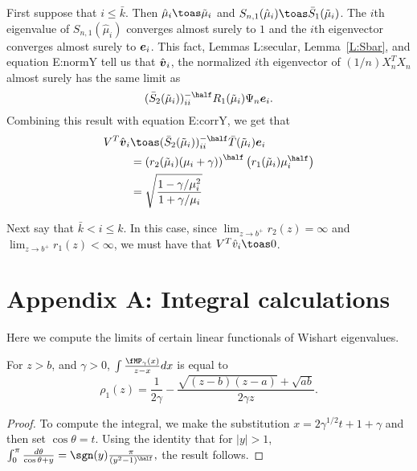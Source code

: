 First suppose that $i \leq \bar k$.  Then $\hat \mu_i \toas \tilde \mu_i$ and
$S_{n,1}(\hat \mu_i) \toas \bar S_1 (\tilde \mu_i)$.  The $i$th eigenvalue
of $S_{n,1} (\hat \mu_i)$ converges almost surely to $1$ and the $i$th
eigenvector converges almost surely to $\boldsymbol{e}_i$.  This fact, 
Lemmas {L:secular}, Lemma~\ref{L:Sbar}, and equation {E:normY} 
tell us that $\hat {\boldsymbol{v}}_i$, the normalized $i$th eigenvector of
$(1/n) X_n^T X_n$ almost surely has the same limit as
\[
    (\bar S_2(\tilde \mu_i))_{ii}^{-\half} R_1(\tilde \mu_i) \Psi_n \be_i.
\]
Combining this result with equation {E:corrY}, we get that
\begin{align*}
    V^T \hat \bv_i
        &\toas
        (\bar S_2(\tilde \mu_i))_{ii}^{-\half} \bar T(\tilde \mu_i) \be_i \\
        &= \left( r_2( \tilde \mu_i ) (\mu_i + \gamma )\right)^\half
           \left( r_1( \tilde \mu_i ) \mu_i^\half \right) \\
        &= \sqrt{
                \frac{ 1 - \gamma/\mu_i^2}
                     { 1 + \gamma/\mu_i  }
           }
\end{align*}

Next say that $\bar k < i \leq k$.  In this case, since 
$\lim_{z \to b^+} r_2(z) = \infty$ and $\lim_{z \to b^+} r_1(z) < \infty$, we must have that  $V^T \hat v_i \toas 0$.

\section*{Appendix A: Integral calculations}

Here we compute the limits of certain linear functionals of Wishart
eigenvalues.

\begin{lemma}
    For $z > b$, and $\gamma > 0$, $\int \frac{\fMP_\gamma(x)}{z - x} dx$
    is equal to
    \[
        \rho_1(z) 
        =
        \frac{1}{2 \gamma}
        -
        \frac{ \sqrt{(z - b)(z - a)} + \sqrt{ a b } }
             { 2 \gamma z}.
    \]
\end{lemma}
\begin{proof}
    To compute the integral, we make the substitution 
    $x = 2 \gamma^{1/2} t + 1 + \gamma$ and then set $\cos \theta = t$.
    Using the identity that for $|y| > 1$,
    \(
        \int_0^\pi \frac{d\theta}{\cos \theta + y}
        = \sgn(y) \frac{\pi}{(y^2 - 1)^\half},
    \)
    the result follows.
\end{proof}

